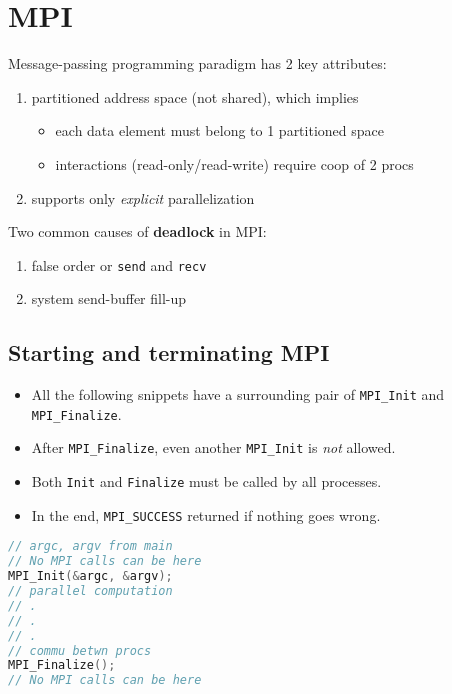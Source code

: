 \section*{MPI}
Message-passing programming paradigm has 2 key attributes:
\begin{enumerate}
\item partitioned address space (not shared), which implies
  \begin{itemize}
  \item each data element must belong to 1 partitioned space
  \item interactions (read-only/read-write) require coop of 2 procs
  \end{itemize}
\item supports only \emph{explicit} parallelization
\end{enumerate}
Two common causes of \textbf{deadlock} in MPI:
\begin{enumerate}
\item false order or \texttt{send} and \texttt{recv}
\item system send-buffer fill-up
\end{enumerate}

\subsection*{Starting and terminating MPI}
\begin{minipage}{0.5\linewidth}
  \begin{itemize}
  \item All the following snippets have a surrounding pair of \texttt{MPI\_Init} and \texttt{MPI\_Finalize}.
  \item After \texttt{MPI\_Finalize}, even another \texttt{MPI\_Init} is \emph{not} allowed.
  \item Both \texttt{Init} and \texttt{Finalize} must be called by all processes.
  \item In the end, \texttt{MPI\_SUCCESS} returned if nothing goes wrong.
  \end{itemize}
\end{minipage}
\begin{minipage}{0.48\linewidth}
  \centering
\begin{lstlisting}[language=c,xleftmargin=1pt]
// argc, argv from main
// No MPI calls can be here
MPI_Init(&argc, &argv);
// parallel computation
// .
// .
// .
// commu betwn procs
MPI_Finalize();
// No MPI calls can be here
\end{lstlisting}
\end{minipage}

